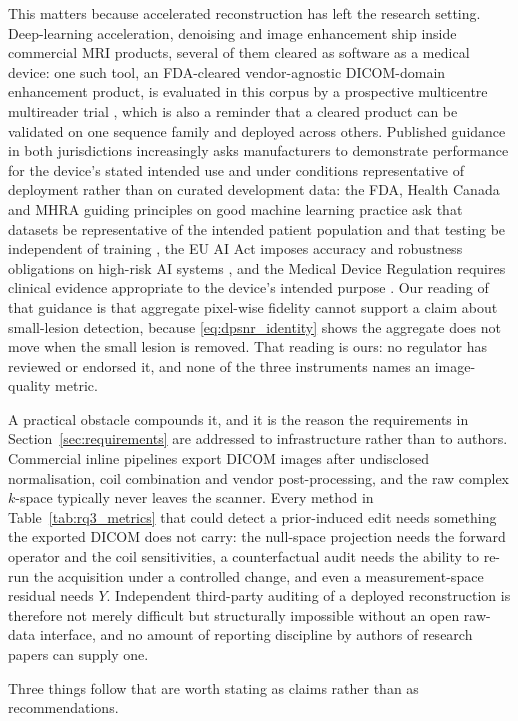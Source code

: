 \documentclass[review,authoryear]{elsarticle}
\begin{document}
This matters because accelerated reconstruction has left the research setting.
Deep-learning acceleration, denoising and image enhancement ship inside commercial MRI
products, several of them cleared as software as a medical device: one such tool, an
FDA-cleared vendor-agnostic DICOM-domain enhancement product, is evaluated in this
corpus by a prospective multicentre multireader trial \citep{bash2021deep}, which is
also a reminder that a cleared product can be validated on one sequence family and
deployed across others. Published guidance in both jurisdictions increasingly asks
manufacturers to demonstrate performance for the device's stated intended use and under
conditions representative of deployment rather than on curated development data: the
FDA, Health Canada and MHRA guiding principles on good machine learning practice ask
that datasets be representative of the intended patient population and that testing be
independent of training \citep{fda2021gmlp}, the EU AI Act imposes accuracy and
robustness obligations on high-risk AI systems \citep{euaiact2024}, and the Medical
Device Regulation requires clinical evidence appropriate to the device's intended
purpose \citep{eumdr2017}. Our reading of that guidance is that aggregate pixel-wise
fidelity cannot support a claim about small-lesion detection, because
\eqref{eq:dpsnr_identity} shows the aggregate does not move when the small lesion is
removed. That reading is ours: no regulator has reviewed or endorsed it, and none of the
three instruments names an image-quality metric.

A practical obstacle compounds it, and it is the reason the requirements in
Section~\ref{sec:requirements} are addressed to infrastructure rather than to authors.
Commercial inline pipelines export DICOM images after undisclosed normalisation, coil
combination and vendor post-processing, and the raw complex $k$-space typically never
leaves the scanner. Every method in Table~\ref{tab:rq3_metrics} that could detect a
prior-induced edit needs something the exported DICOM does not carry: the null-space
projection needs the forward operator and the coil sensitivities, a counterfactual audit
needs the ability to re-run the acquisition under a controlled change, and even a
measurement-space residual needs $Y$. Independent third-party auditing of a deployed
reconstruction is therefore not merely difficult but structurally impossible without an
open raw-data interface, and no amount of reporting discipline by authors of research
papers can supply one.

Three things follow that are worth stating as claims rather than as recommendations.
\end{document}
